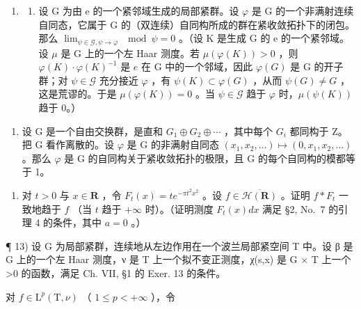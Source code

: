 \begin{enumerate}
\def\labelenumi{\arabic{enumi})}
\setcounter{enumi}{10}
\tightlist
\item
  \begin{enumerate}
  \def\labelenumii{\alph{enumii})}
  \tightlist
  \item
    设 G 为由 e 的一个紧邻域生成的局部紧群。设 \(\varphi\) 是 G 的一个非满射连续自同态，它属于 G 的（双连续）自同构所成的群在紧收敛拓扑下的闭包。那么 \(\lim_{\psi\in\mathcal{G},\psi\to\varphi}\mod\psi=0\) 。（设 K 是生成 G 的 e 的一个紧邻域。设 \(\mu\) 是 G 上的一个左 Haar 测度。若 \(\mu(\varphi(K)) > 0\) ，则 \(\varphi(K) \cdot \varphi(K)^{-1}\) 是 \(e\) 在 G 中的一个邻域，因此 \(\varphi(G)\) 是 G 的开子群；对 \(\psi \in \mathcal{G}\) 充分接近 \(\varphi\) ，有 \(\psi(K) \subset \varphi(G)\) ，从而 \(\psi(G) \neq G\) ，这是荒谬的。于是 \(\mu(\varphi(K)) = 0\) 。当 \(\psi \in \mathcal{G}\) 趋于 \(\varphi\) 时，\(\mu(\psi(K))\) 趋于 0。）
  \end{enumerate}
\end{enumerate}

\begin{enumerate}
\def\labelenumi{\alph{enumi})}
\setcounter{enumi}{1}
\tightlist
\item
  设 G 是一个自由交换群，是直和 \(G_{1} \oplus G_{2} \oplus \cdots\) ，其中每个 \(G_{i}\) 都同构于 Z。把 G 看作离散的。设 \(\varphi\) 是 G 的非满射自同态 \((x_{1}, x_{2}, \ldots) \mapsto (0, x_{1}, x_{2}, \ldots)\) 。那么 \(\varphi\) 是 G 的自同构关于紧收敛拓扑的极限，且 G 的每个自同构的模都等于 1。
\end{enumerate}

\begin{enumerate}
\def\labelenumi{\arabic{enumi})}
\setcounter{enumi}{11}
\tightlist
\item
  对 \(t > 0\) 与 \(x \in \mathbf{R}\) ，令 \(F_t(x) = te^{-\pi t^2 x^2}\) 。设 \(f \in \overline{\mathcal{H}(\mathbf{R})}\) 。证明 \(f * F_t\) 一致地趋于 \(f\) （当 \(t\) 趋于 \(+\infty\) 时）。（证明测度 \(F_t(x) dx\) 满足 §2, No.~7 的引理 4 的条件，其中 \(a = 0\) 。）
\end{enumerate}

¶ 13) 设 G 为局部紧群，连续地从左边作用在一个波兰局部紧空间 T 中。设 β 是 G 上的一个左 Haar 测度，ν 是 T 上一个拟不变正测度，χ(s,x) 是 G × T 上一个 \textgreater0 的函数，满足 Ch. VII, §1 的 Exer. 13 的条件。

对 \(f \in \mathrm{L}^p(\mathrm{T}, \nu)\) （ \(1 \leqslant p < +\infty\) ），令

